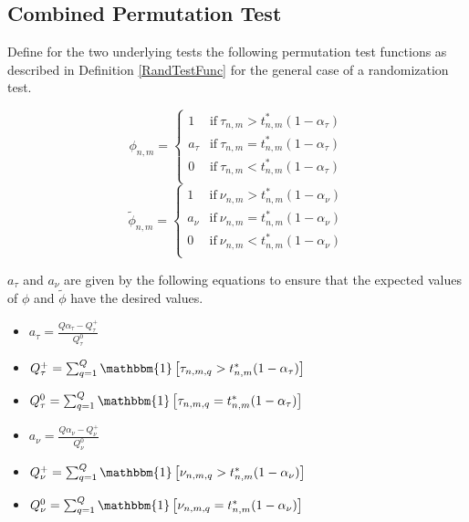 \documentclass[12pt, a4paper]{article}
\theoremstyle{MAstyle} \newtheorem{assumption}{Assumption}[section]
\theoremstyle{MAstyle} \newtheorem{definition}{Definition}[section]
\theoremstyle{MAstyle} \newtheorem{theorem}{Theorem}[section]
\begin{document}
		\subsection{Combined Permutation Test}
			Define for the two underlying tests the following permutation test functions as described in Definition \ref{RandTestFunc} for the general case of a randomization test.
			\begin{multicols}{2}
				\noindent
				\begin{equation*}
					\phi_{n,m} = \begin{cases}
						1 &\text{if} \ \tau_{n,m} > t^{*}_{n,m}(1-\alpha_{\tau}) \\
						a_{\tau} &\text{if} \ \tau_{n,m} = t^{*}_{n,m}(1-\alpha_{\tau}) \\
						0 &\text{if} \ \tau_{n,m} < t^{*}_{n,m}(1-\alpha_{\tau}) \\
					\end{cases}
				\end{equation*}
				\begin{equation}
					\tilde{\phi}_{n,m} = \begin{cases}
						1 &\text{if} \ \nu_{n,m} > t^{*}_{n,m}(1-\alpha_{\nu}) \\
						a_{\nu} &\text{if} \ \nu_{n,m} = t^{*}_{n,m}(1-\alpha_{\nu}) \\
						0 &\text{if} \ \nu_{n,m} < t^{*}_{n,m}(1-\alpha_{\nu}) \\
					\end{cases}
				\end{equation}
			\end{multicols}
			$a_\tau$ and $a_\nu$ are given by the following equations to ensure that the expected values of $\phi$ and $\tilde{\phi}$ have the desired values.
			\begin{multicols}{2}
				\begin{itemize}
					\item $a_{\tau} = \frac{Q\alpha_{\tau} - Q_{\tau}^{+}}{Q_{\tau}^{0}}$ 
					\item $Q_{\tau}^{+} = \sum_{q = 1}^{Q}\mathbbm{1}\left[\tau_{n,m,q} > t^{*}_{n,m}(1-\alpha_{\tau})\right]$
					\item $Q_{\tau}^{0} = \sum_{q = 1}^{Q}\mathbbm{1}\left[\tau_{n,m,q} = t^{*}_{n,m}(1-\alpha_{\tau})\right]$
					\item $a_{\nu} = \frac{Q\alpha_{\nu} - Q_{\nu}^{+}}{Q_{\nu}^{0}}$ 
					\item $Q_{\nu}^{+} = \sum_{q = 1}^{Q}\mathbbm{1}\left[\nu_{n,m,q} > t^{*}_{n,m}(1-\alpha_{\nu})\right]$
					\item $Q_{\nu}^{0} = \sum_{q = 1}^{Q}\mathbbm{1}\left[\nu_{n,m,q} = t^{*}_{n,m}(1-\alpha_{\nu})\right]$
				\end{itemize} 
			\end{multicols}
			
\end{document}
